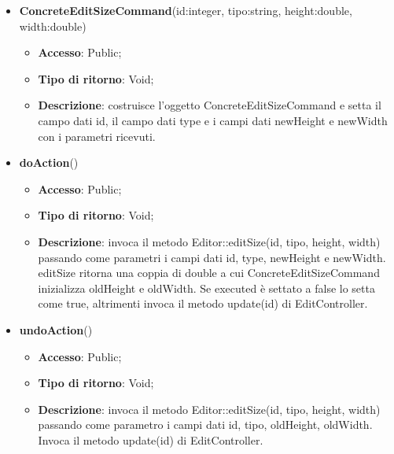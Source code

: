 {{{	
	\begin{itemize}
		\item \textbf{ConcreteEditSizeCommand}(id:integer, tipo:string, height:double, width:double)
		\begin{itemize}
			\item \textbf{Accesso}: Public;
			\item \textbf{Tipo di ritorno}: Void;
			\item \textbf{Descrizione}: costruisce l’oggetto ConcreteEditSizeCommand e setta il campo dati id, il campo dati type e i campi dati newHeight e newWidth con i parametri ricevuti.
		\end{itemize}
		\item \textbf{doAction}()
		\begin{itemize}
			\item \textbf{Accesso}: Public;
			\item \textbf{Tipo di ritorno}: Void;
			\item \textbf{Descrizione}: invoca il metodo Editor::editSize(id, tipo, height, width) passando come parametri i campi dati id, type, newHeight e newWidth. editSize ritorna una coppia di double a cui ConcreteEditSizeCommand inizializza oldHeight e oldWidth. Se executed è settato a false lo setta come true, altrimenti invoca il metodo update(id) di EditController.
		\end{itemize}
		\item \textbf{undoAction}()
		\begin{itemize}
			\item \textbf{Accesso}: Public;
			\item \textbf{Tipo di ritorno}: Void;
			\item \textbf{Descrizione}: invoca il metodo Editor::editSize(id, tipo, height, width) passando come parametro i campi dati id, tipo, oldHeight, oldWidth. Invoca il metodo update(id) di EditController.
		\end{itemize}
	\end{itemize}
	}
}}
